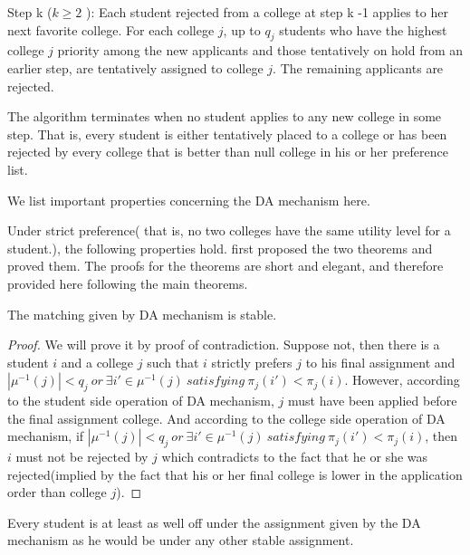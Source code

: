 Step k ($ k \geq 2$ ): Each student rejected from a college at step k -1 applies to her next favorite college.
For each college $j$, up to $q_j$  students who have the highest college
$j$ priority among the new applicants and those tentatively on hold from an earlier step, are
tentatively assigned to college $j$. 
The remaining applicants are rejected.

The algorithm terminates when no student applies to any new college in
some step. That is, every  student is either tentatively placed to a college
or has been rejected by every college that is better than null college
in his or her preference list. 

We list important properties concerning the DA mechanism here.

Under strict preference( that is, no two colleges have  the same utility
level for a student.), the following properties
hold. \parencite{Gale1962} first proposed the two theorems and proved
them. The proofs for the theorems are short and elegant, and therefore
provided here following the main theorems.

\begin{thm}
The matching given by DA mechanism is stable.
\end{thm}

\begin{proof}
We will prove it by proof of contradiction. Suppose not, then there is
a student $i$ and  a college $j$  such that $i$ strictly prefers $j$ to his
final assignment and $|\mu^{-1}(j)|< q_j\ or\  \exists i' \in
\mu^{-1}(j)\  satisfying\ \pi_{j}(i') < \pi_{j}(i)$.  However,
according to the student side operation of DA mechanism,  $j$ must have been applied before the
final assignment college. And  according to the college side operation
of DA mechanism, if  $|\mu^{-1}(j)|< q_j\ or\  \exists i' \in
\mu^{-1}(j)\  satisfying\ \pi_{j}(i') < \pi_{j}(i)$, then $i$ must not
be rejected by $j$ which contradicts to the fact that he or she was
rejected(implied by the fact that his or her final college is lower in
the application order than college $j$).
\end{proof}
\begin{thm}
Every student is at least as well off under the assignment given by
the DA mechanism as he would be under any other stable assignment.
\end{thm}


